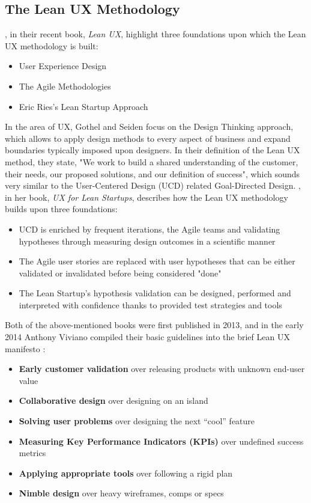 \documentclass{article}
\begin{document}
\subsection{The Lean UX Methodology}
\citeauthor{gothelf2016lean}, in their recent book, \textit{Lean UX}, \citep{gothelf2016lean} highlight three foundations upon which the Lean UX methodology is built:
\begin{itemize}
  \item User Experience Design
  \item The Agile Methodologies
  \item Eric Ries's Lean Startup Approach
\end{itemize}
In the area of UX, Gothel and Seiden focus on the Design Thinking approach, which allows to apply design methods to every aspect of business and expand boundaries typically imposed upon designers. In their definition of the Lean UX method, they state, "We work to build a shared understanding of the customer, their needs, our proposed solutions, and our definition of success", which sounds very similar to the User-Centered Design (UCD) related Goal-Directed Design.
\cite{klein2013ux}, in her book, \textit{UX for Lean Startups}, describes how the Lean UX methodology builds upon three foundations:
\begin{itemize}
  \item UCD is enriched by frequent iterations, the Agile teams and validating hypotheses through measuring design outcomes in a scientific manner
  \item The Agile user stories are replaced with user hypotheses that can be either validated or invalidated before being considered "done"
  \item The Lean Startup's hypothesis validation can be designed, performed and interpreted with confidence thanks to provided test strategies and tools
\end{itemize}
Both of the above-mentioned books were first published in 2013, and in the early 2014 Anthony Viviano compiled their basic guidelines into the brief Lean UX manifesto \citep{viviano2014lean}:
\begin{itemize}
  \item \textbf{Early customer validation} over releasing products with unknown end-user value
  \item \textbf{Collaborative design} over designing on an island
  \item \textbf{Solving user problems} over designing the next “cool” feature
  \item \textbf{Measuring Key Performance Indicators (KPIs)} over undefined success metrics
  \item \textbf{Applying appropriate tools} over following a rigid plan
  \item \textbf{Nimble design} over heavy wireframes, comps or specs
\end{itemize}
\end{document}
